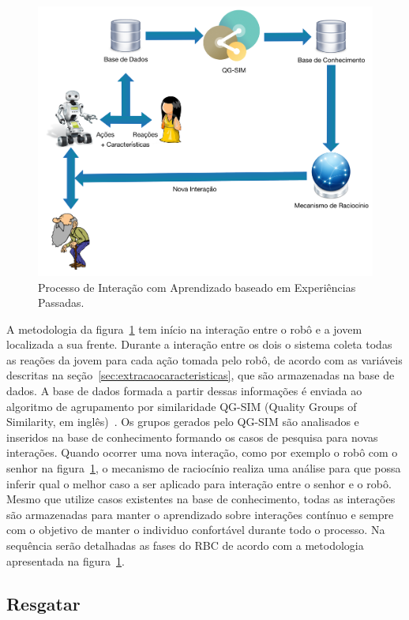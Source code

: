 \begin{figure}[ht!]
	\centering
	\includegraphics[width=\textwidth]{images/rbc_geral.png}
	\caption{Processo de Interação com Aprendizado baseado em Experiências Passadas.}
	\label{fig:rbc}
\end{figure}

A metodologia da figura~\ref{fig:rbc} tem início na interação entre o robô e a jovem localizada a sua frente. Durante a interação entre os dois o sistema coleta todas as reações da jovem para cada ação tomada pelo robô, de acordo com as variáveis descritas na seção~\ref{sec:extracaocaracteristicas}, que são armazenadas na base de dados. A base de dados formada a partir dessas informações é enviada ao algoritmo de agrupamento por similaridade QG-SIM (Quality Groups of Similarity, em inglês)~\cite{Masiero:2013}. Os grupos gerados pelo QG-SIM são analisados e inseridos na base de conhecimento formando os casos de pesquisa para novas interações. Quando ocorrer uma nova interação, como por exemplo o robô com o senhor na figura~\ref{fig:rbc}, o mecanismo de raciocínio realiza uma análise para que possa inferir qual o melhor caso a ser aplicado para interação entre o senhor e o robô. Mesmo que utilize casos existentes na base de conhecimento, todas as interações são armazenadas para manter o aprendizado sobre interações contínuo e sempre com o objetivo de manter o individuo confortável durante todo o processo. Na sequência serão detalhadas as fases do RBC de acordo com a metodologia apresentada na figura~\ref{fig:rbc}.

\subsection{Resgatar}
\label{sec:resgatar}


